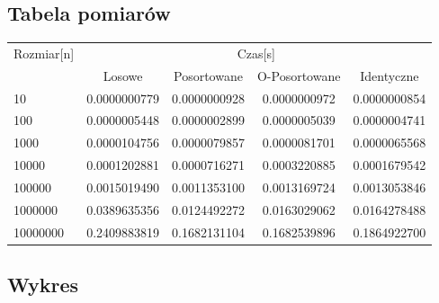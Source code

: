 \documentclass[13pt]{article}
\begin{document}
\subsection{Tabela pomiarów}

\begin{center}
\begin{tabular}{lcccc}  
\\
\toprule
Rozmiar[n] & \multicolumn{4}{c}{Czas[s]} \\
\cmidrule(r){2-5}
 & Losowe & Posortowane & O-Posortowane & Identyczne \\
\midrule
10       & 0.0000000779  & 0.0000000928 & 0.0000000972  & 0.0000000854 \\
100      & 0.0000005448  & 0.0000002899 & 0.0000005039  & 0.0000004741 \\
1000     & 0.0000104756  & 0.0000079857 & 0.0000081701  & 0.0000065568 \\
10000    & 0.0001202881  & 0.0000716271 & 0.0003220885  & 0.0001679542 \\
100000   & 0.0015019490  & 0.0011353100 & 0.0013169724  & 0.0013053846 \\
1000000  & 0.0389635356  & 0.0124492272 & 0.0163029062  & 0.0164278488 \\
10000000 & 0.2409883819  & 0.1682131104 & 0.1682539896  & 0.1864922700 \\
\bottomrule
\end{tabular}
\end{center}

\subsection{Wykres}
\end{document}
